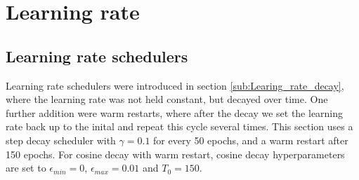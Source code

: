\section{Learning rate}\label{res:Learning_rate}
\subsection{Learning rate schedulers}\label{res:Scheduler}
Learning rate schedulers were introduced in section \ref{sub:Learing_rate_decay},
where the learning rate was not held constant, but decayed over time. One
further addition were warm restarts, where after the decay we set the learning
rate back up to the inital and repeat this cycle several times. This section uses a step
decay scheduler with $\gamma = 0.1$ for every 50 epochs, and a warm restart
after 150 epochs. For cosine decay with warm restart, cosine decay hyperparameters are set to $\epsilon_{min}=0$,
$\epsilon_{max}=0.01$ and $T_0=150$.




